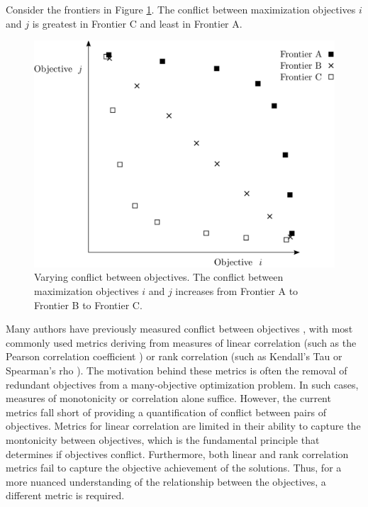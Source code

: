 Consider the frontiers in Figure \ref{fig:ConflictVariesExample}. The conflict between maximization objectives $i$ and $j$ is greatest in Frontier C and least in Frontier A.
\begin{figure}[ht]
\centering
\includegraphics[width=.6\textwidth]{../images/ConflictVariesExample}
\caption[Example of varying conflict between objectives]{Varying conflict between objectives. The conflict between maximization objectives $i$ and $j$ increases from Frontier A to Frontier B to Frontier C.}
\label{fig:ConflictVariesExample}
\end{figure}

Many authors have previously measured conflict between objectives \cite{brockhoff2009objective}\cite{purshouse2003conflict}\cite{gal1977redundant}, with most commonly used metrics deriving from measures of linear correlation (such as the Pearson correlation coefficient \cite{deb2006searching}) or rank correlation (such as Kendall's Tau \cite{kanoulas2009empirical} or Spearman's rho \cite{karande2012application}). The motivation behind these metrics is often the removal of redundant objectives from a many-objective optimization problem. In such cases, measures of monotonicity or correlation alone suffice. However, the current metrics fall short of providing a quantification of conflict between pairs of objectives. Metrics for linear correlation are limited in their ability to capture the montonicity between objectives, which is the fundamental principle that determines if objectives conflict. Furthermore, both linear and rank correlation metrics fail to capture the objective achievement of the solutions. Thus, for a more nuanced understanding of the relationship between the objectives, a different metric is required.

